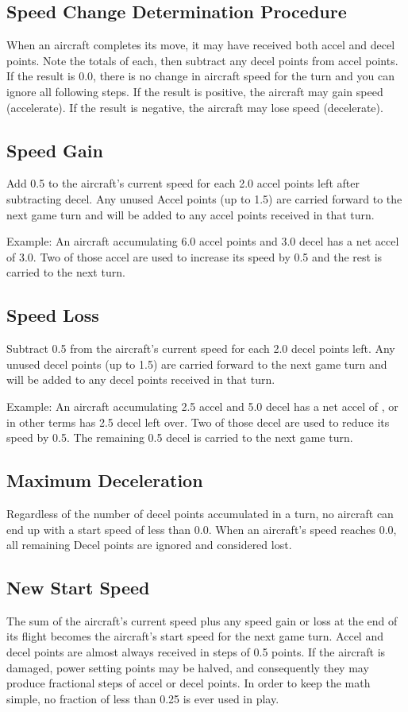 \subsection{Speed Change Determination Procedure} When an aircraft completes its move, it may have received both accel and decel points. Note the totals of each, then subtract any decel points from accel points. If the result is 0.0, there is no change in aircraft speed for the turn and you can ignore all following steps. If the result is positive, the aircraft may gain speed (accelerate). If the result is negative, the aircraft may lose speed (decelerate).

\subsection{Speed Gain}
Add 0.5 to the aircraft's current speed for each 2.0 accel points left after subtracting decel.  Any unused Accel points (up to 1.5) are carried forward to the next game turn and will be added to any accel points received in that turn.

Example: An aircraft accumulating 6.0 accel points and 3.0 decel has a net accel of 3.0. Two of those accel are used to increase its speed by 0.5 and the rest is carried to the next turn.

\subsection{Speed Loss}
Subtract 0.5 from the aircraft's current speed for each 2.0 decel points left. Any unused decel points (up to 1.5) are carried forward to the next game turn and will be added to any decel points received in that turn.

Example: An aircraft accumulating 2.5 accel and 5.0 decel has a net accel of , or in other terms has 2.5 decel left over. Two of those decel are used to reduce its speed by 0.5. The remaining 0.5 decel is carried to the next game turn.

\subsection{Maximum Deceleration}
Regardless of the number of decel points accumulated in a turn, no aircraft can end up with a start speed of less than 0.0. When an aircraft's speed reaches 0.0, all remaining Decel points are ignored and considered lost.

\subsection{New Start Speed}
The sum of the aircraft's current speed plus any speed gain or loss at the end of its flight becomes the aircraft's start speed for the next game turn. Accel and decel points are almost always received in steps of 0.5 points. If the aircraft is damaged, power setting points may be halved, and consequently they may produce fractional steps of accel or decel points. In order to keep the math simple, no fraction of less than 0.25 is ever used in play.

